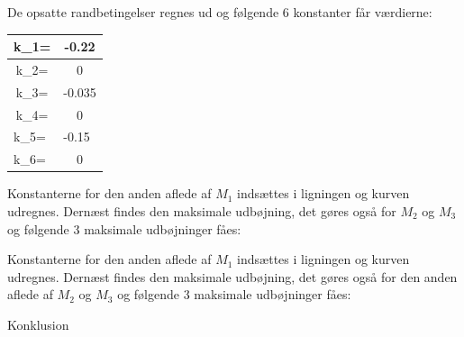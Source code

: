 De opsatte randbetingelser regnes ud og følgende 6 konstanter får værdierne: 

\begin{table}[h]
	\begin{tabular}{|c|c|}
		\hline
		k\_1=                       & -0.22                      \\ \hline
		k\_2=                       & 0                          \\ \hline
		k\_3=                       & -0.035                     \\ \hline
		k\_4=                       & 0                          \\ \hline
		\multicolumn{1}{|l|}{k\_5=} & \multicolumn{1}{l|}{-0.15} \\ \hline
		\multicolumn{1}{|l|}{k\_6=} & 0                          \\ \hline
	\end{tabular}
\end{table}

Konstanterne for den anden aflede af $M_1$ indsættes i ligningen og kurven udregnes. Dernæst findes den maksimale udbøjning, det gøres også for $M_2$ og $M_3$ og følgende 3 maksimale udbøjninger fåes: 

Konstanterne for den anden aflede af $M_1$ indsættes i ligningen og kurven udregnes. Dernæst findes den maksimale udbøjning, det gøres også for den anden aflede af $M_2$ og $M_3$ og følgende 3 maksimale udbøjninger fåes: 



Konklusion